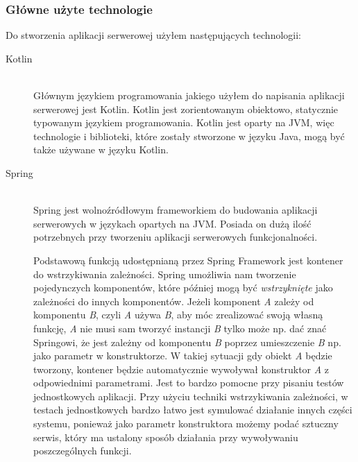 \subsubsection{Główne użyte technologie}
Do stworzenia aplikacji serwerowej użyłem następujących technologii:

\begin{description}
  \item[Kotlin] \hfill \\ Głównym językiem programowania jakiego użyłem do napisania aplikacji serwerowej jest Kotlin. Kotlin jest zorientowanym obiektowo, statycznie typowanym językiem programowania. Kotlin jest oparty na JVM, więc technologie i biblioteki, które zostały stworzone w języku Java, mogą być także używane w języku Kotlin. 
  \item[Spring] \hfill \\ Spring jest wolnoźródłowym frameworkiem do budowania aplikacji serwerowych w językach opartych na JVM. Posiada on dużą ilość potrzebnych przy tworzeniu aplikacji serwerowych funkcjonalności. 

    Podstawową funkcją udostępnianą przez Spring Framework jest kontener do wstrzykiwania zależności. Spring umożliwia nam tworzenie pojedynczych komponentów, które później mogą być \emph{wstrzyknięte} jako zależności do innych komponentów. Jeżeli komponent \emph{A} zależy od komponentu \emph{B}, czyli \emph{A} używa \emph{B}, aby móc zrealizować swoją własną funkcję, \emph{A} nie musi sam tworzyć instancji \emph{B} tylko może np. dać znać Springowi, że jest zależny od komponentu \emph{B} poprzez umieszczenie \emph{B} np. jako parametr w konstruktorze. W takiej sytuacji gdy obiekt \emph{A} będzie tworzony, kontener będzie automatycznie wywoływał konstruktor \emph{A} z odpowiednimi parametrami. Jest to bardzo pomocne przy pisaniu testów jednostkowych aplikacji. Przy użyciu techniki wstrzykiwania zależności, w testach jednostkowych bardzo łatwo jest symulować działanie innych części systemu, ponieważ jako parametr konstruktora możemy podać sztuczny serwis, który ma ustalony sposób działania przy wywoływaniu poszczególnych funkcji.


\end{description}
